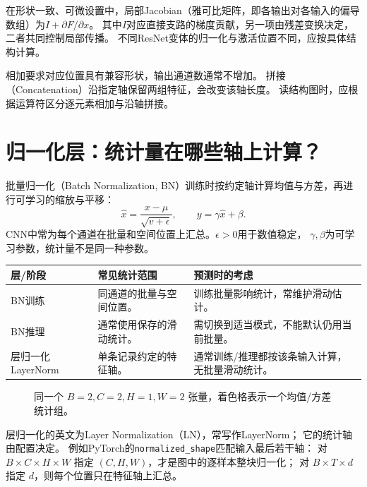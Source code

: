 在形状一致、可微设置中，局部Jacobian（雅可比矩阵，即各输出对各输入的偏导数组）为$I+\partial F/\partial x$。
其中$I$对应直接支路的梯度贡献，另一项由残差变换决定，二者共同控制局部传播。
不同ResNet变体的归一化与激活位置不同，应按具体结构计算。

\begin{pitfall}[相加与拼接不同]
相加要求对应位置具有兼容形状，输出通道数通常不增加。
拼接（Concatenation）沿指定轴保留两组特征，会改变该轴长度。
读结构图时，应根据运算符区分逐元素相加与沿轴拼接。
\end{pitfall}

\section{归一化层：统计量在哪些轴上计算？}
\label{sec:cnn-normalization}
批量归一化（Batch Normalization, BN）训练时按约定轴计算均值与方差，再进行可学习的缩放与平移：
\[
 \hat x=\frac{x-\mu}{\sqrt{v+\epsilon}},\qquad y=\gamma\hat x+\beta.
\]
CNN中常为每个通道在批量和空间位置上汇总。$\epsilon>0$用于数值稳定，
$\gamma,\beta$为可学习参数，统计量不是同一种参数。

\begin{center}
\begin{tabularx}{\textwidth}{P{33mm}YY}
\toprule
层/阶段 & 常见统计范围 & 预测时的考虑\\
\midrule
BN训练 & 同通道的批量与空间位置。 & 训练批量影响统计，常维护滑动估计。\\
BN推理 & 通常使用保存的滑动统计。 & 需切换到适当模式，不能默认仍用当前批量。\\
层归一化 LayerNorm & 单条记录约定的特征轴。 & 通常训练/推理都按该条输入计算，无批量滑动统计。\\
\bottomrule
\end{tabularx}
\end{center}

\begin{figure}[htbp]
\centering
\caption{同一个 $B=2,C=2,H=1,W=2$ 张量，着色格表示一个均值/方差统计组。}
\par\smallskip
{}
\end{figure}

层归一化的英文为Layer Normalization（LN），常写作LayerNorm；
它的统计轴由配置决定。
例如PyTorch的\texttt{normalized\_shape}匹配输入最后若干轴：
对 $B\times C\times H\times W$ 指定 $(C,H,W)$，才是图中的逐样本整块归一化；
对 $B\times T\times d$ 指定 $d$，则每个位置只在特征轴上汇总。

